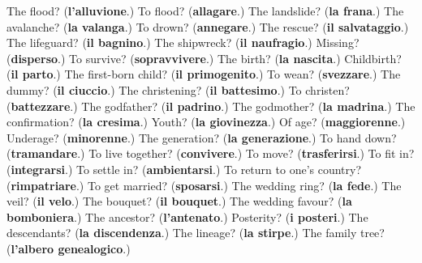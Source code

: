 \begin{tcolorbox}[breakable,colback=teal!4,colframe=teal!35!black,title={Before you move on}]
The flood? (\textbf{l'alluvione}.) To flood? (\textbf{allagare}.) The landslide? (\textbf{la frana}.) The avalanche? (\textbf{la valanga}.) To drown? (\textbf{annegare}.) The rescue? (\textbf{il salvataggio}.) The lifeguard? (\textbf{il bagnino}.) The shipwreck? (\textbf{il naufragio}.) Missing? (\textbf{disperso}.) To survive? (\textbf{sopravvivere}.) The birth? (\textbf{la nascita}.) Childbirth? (\textbf{il parto}.) The first-born child? (\textbf{il primogenito}.) To wean? (\textbf{svezzare}.) The dummy? (\textbf{il ciuccio}.) The christening? (\textbf{il battesimo}.) To christen? (\textbf{battezzare}.) The godfather? (\textbf{il padrino}.) The godmother? (\textbf{la madrina}.) The confirmation? (\textbf{la cresima}.) Youth? (\textbf{la giovinezza}.) Of age? (\textbf{maggiorenne}.) Underage? (\textbf{minorenne}.) The generation? (\textbf{la generazione}.) To hand down? (\textbf{tramandare}.) To live together? (\textbf{convivere}.) To move? (\textbf{trasferirsi}.) To fit in? (\textbf{integrarsi}.) To settle in? (\textbf{ambientarsi}.) To return to one's country? (\textbf{rimpatriare}.) To get married? (\textbf{sposarsi}.) The wedding ring? (\textbf{la fede}.) The veil? (\textbf{il velo}.) The bouquet? (\textbf{il bouquet}.) The wedding favour? (\textbf{la bomboniera}.) The ancestor? (\textbf{l'antenato}.) Posterity? (\textbf{i posteri}.) The descendants? (\textbf{la discendenza}.) The lineage? (\textbf{la stirpe}.) The family tree? (\textbf{l'albero genealogico}.)
\end{tcolorbox}
